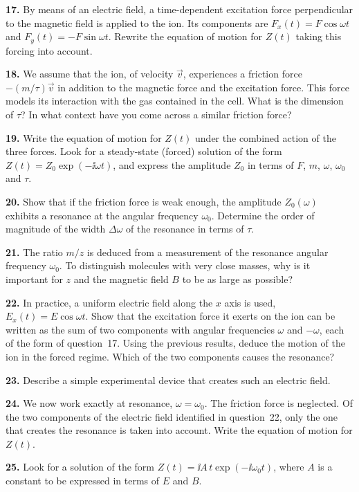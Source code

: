 \documentclass[11pt,a4paper]{article}
\newcommand{\q}[1]{\par\medskip\noindent\textbf{#1.}\enspace}
\newcommand{\vv}[1]{\vec{#1}}
\begin{document}

\q{17} By means of an electric field, a time-dependent excitation force perpendicular to the
magnetic field is applied to the ion. Its components are $F_x(t) = F\cos\omega t$ and
$F_y(t) = -F\sin\omega t$. Rewrite the equation of motion for $Z(t)$ taking this forcing into
account.

\q{18} We assume that the ion, of velocity $\vv v$, experiences a friction force
$-(m/\tau)\vv v$ in addition to the magnetic force and the excitation force. This force models
its interaction with the gas contained in the cell. What is the dimension of $\tau$? In what
context have you come across a similar friction force?

\q{19} Write the equation of motion for $Z(t)$ under the combined action of the three forces.
Look for a steady-state (forced) solution of the form $Z(t) = Z_0\exp(-\ii\omega t)$, and
express the amplitude $Z_0$ in terms of $F$, $m$, $\omega$, $\omega_0$ and $\tau$.

\q{20} Show that if the friction force is weak enough, the amplitude $Z_0(\omega)$ exhibits a
resonance at the angular frequency $\omega_0$. Determine the order of magnitude of the width
$\Delta\omega$ of the resonance in terms of $\tau$.

\q{21} The ratio $m/z$ is deduced from a measurement of the resonance angular frequency
$\omega_0$. To distinguish molecules with very close masses, why is it important for $z$ and
the magnetic field $B$ to be as large as possible?

\q{22} In practice, a uniform electric field along the $x$ axis is used,
$E_x(t) = E\cos\omega t$. Show that the excitation force it exerts on the ion can be written as
the sum of two components with angular frequencies $\omega$ and $-\omega$, each of the form of
question~17. Using the previous results, deduce the motion of the ion in the forced regime.
Which of the two components causes the resonance?

\q{23} Describe a simple experimental device that creates such an electric field.

\q{24} We now work exactly at resonance, $\omega = \omega_0$. The friction force is neglected.
Of the two components of the electric field identified in question~22, only the one that
creates the resonance is taken into account. Write the equation of motion for $Z(t)$.

\q{25} Look for a solution of the form $Z(t) = \ii A\,t\exp(-\ii\omega_0t)$, where $A$ is a
constant to be expressed in terms of $E$ and $B$.
\end{document}
